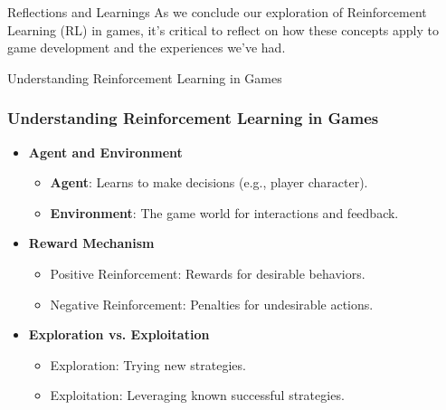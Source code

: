 \documentclass[aspectratio=169]{beamer}
\begin{document}
\begin{frame}[fragile]{Reflections and Learnings}
    As we conclude our exploration of Reinforcement Learning (RL) in games, it’s critical to reflect on how these concepts apply to game development and the experiences we've had.
\end{frame}

\begin{frame}[fragile]{Understanding Reinforcement Learning in Games}
    \frametitle{Understanding Reinforcement Learning in Games}
    \begin{itemize}
        \item \textbf{Agent and Environment}
        \begin{itemize}
            \item \textbf{Agent}: Learns to make decisions (e.g., player character).
            \item \textbf{Environment}: The game world for interactions and feedback.
        \end{itemize}
        \item \textbf{Reward Mechanism}
        \begin{itemize}
            \item Positive Reinforcement: Rewards for desirable behaviors.
            \item Negative Reinforcement: Penalties for undesirable actions.
        \end{itemize}
        \item \textbf{Exploration vs. Exploitation}
        \begin{itemize}
            \item Exploration: Trying new strategies.
            \item Exploitation: Leveraging known successful strategies.
        \end{itemize}
    \end{itemize}
\end{frame}
\end{document}
